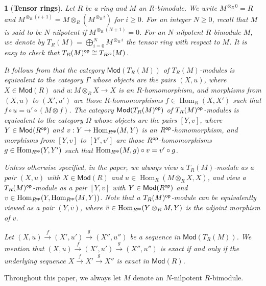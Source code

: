 \documentclass[10pt,twoside]{amsart}
\theoremstyle{bfupright head,slanted body}
\theoremstyle{bfupright head,upright body}
\newtheorem{bfhpg}[res]{}               \newtheorem*{bfhpg*}{}
\theoremstyle{fixed bf head,slanted body}
\theoremstyle{fixed bf head,upright body}
\theoremstyle{numbered paragraph}
\numberwithin{equation}{res}
\newcommand{\Mod}{\mathsf{Mod}}
\newcommand{\Rop}{R^{\sf op}}
\newcommand{\op}{\sf op}
\newcommand{\Hom}{\operatorname{Hom}}
\newcommand{\is}{\cong}
\begin{document}
\begin{bfhpg}[\bf Tensor rings]\label{Tensor rings}
Let $R$ be a ring and $M$ an $R$-bimodule.
We write $M^{\otimes_R 0} = R$ and $M^{\otimes_R (i+1)} = M \otimes_R (M^{\otimes_R i})$
for $i\geqslant 0$.
For an integer $N \geqslant 0$, recall that $M$ is said to be $N$-\emph{nilpotent} if
$M^{\otimes_R(N+1)}=0$.
For an $N$-nilpotent $R$-bimodule $M$, we denote by $T_R(M)=\bigoplus_{i=0}^N M^{\otimes_Ri}$
the \emph{tensor ring} with respect to $M$. It is easy to check that $T_R(M)^{\op}\is T_{\Rop}(M)$.

It follows from \cite{CL} that the category $\Mod(T_R(M))$ of $T_R(M)$-modules
is equivalent to the category $\Gamma$ whose objects are the pairs $(X, u)$,
where $X \in \Mod(R)$ and $u: M\otimes_R X \to X$ is an $R$-homomorphism,
and morphisms from $(X, u)$ to $(X', u')$ are
those $R$-homomorphisms $f \in \Hom_R(X, X')$ such that
$f \circ u = u' \circ (M\otimes f)$.
The category $\Mod(T_R(M)^{\op})$ of $T_R(M)^{\op}$-modules
is equivalent to the category $\Omega$ whose objects are the pairs $[Y, v]$,
where $Y \in \Mod(\Rop)$ and $v: Y \to \Hom_{\Rop}(M, Y)$ is an $\Rop$-homomorphism,
and morphisms from $[Y, v]$ to $[Y', v']$ are
those $\Rop$-homomorphisms $g \in \Hom_{\Rop}(Y, Y')$
such that $\Hom_{\Rop}(M, g) \circ v = v' \circ g$.

Unless otherwise specified, in the paper, we always view a  $T_R(M)$-module as a pair $(X,u)$
with $X \in \Mod(R)$ and $u \in \Hom_R(M \otimes_R X, X)$,
and view a $T_R(M)^{\op}$-module as a pair $[Y, v]$
with $Y \in \Mod(\Rop)$ and $v \in \Hom_{\Rop}(Y,\Hom_{\Rop}(M,Y))$. Note that a $T_R(M)^{\op}$-module can be equivalently viewed as a pair $(Y,\overline{v})$,
where $\overline{v} \in \Hom_{\Rop}(Y\otimes_RM, Y)$ is the adjoint morphism of $v$.

Let $(X, u) \overset{f} \longrightarrow (X', u') \overset{g} \longrightarrow (X'', u'')$ be a sequence in $\Mod(T_R(M))$.
We mention that $(X, u) \overset{f} \longrightarrow (X', u') \overset{g} \longrightarrow (X'', u'')$
is exact if and only if the underlying sequence
$X \overset{f} \longrightarrow X' \overset{g} \longrightarrow X''$
is exact in $\Mod(R)$.
\end{bfhpg}

\setup Throughout this paper, we always let $M$ denote an $N$-nilpotent $R$-bimodule.
\end{document}
